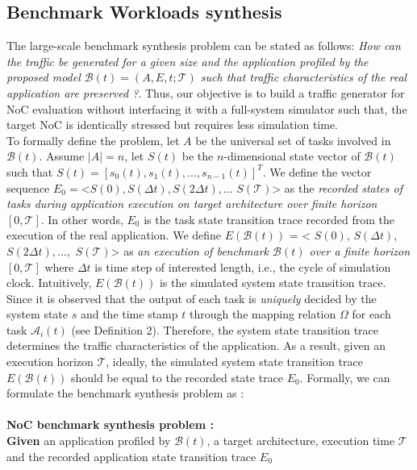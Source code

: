 \subsection{Benchmark Workloads synthesis}
The large-scale benchmark synthesis problem can be stated as follows: \textit{How can the traffic be generated for a given size and the application profiled by the proposed model $\mathcal B(t)=(A,E,t;\mathcal T)$ such that traffic characteristics of the real application are preserved ?}. Thus, our objective is to build a traffic generator for NoC evaluation without interfacing it with a full-system simulator such that, the target NoC is identically stressed but requires less simulation time. \\
\indent To formally define the problem, let $A$ be the universal set of tasks involved in $\mathcal B(t)$. Assume $|A|=n$, let $S(t)$ be the $n$-dimensional state vector of $\mathcal B(t)$ such that $S(t)=[s_0(t),s_1(t),\dots,s_{n-1}(t)]^{T}$. We define the vector sequence $E_0=$<$S(0),S(\Delta t),S(2\Delta t),...$ $S(\mathcal T)$> as the \textit{recorded states of tasks during application execution on target architecture over finite horizon $[0,\mathcal T]$}. In other words, $E_{0}$ is the task state transition trace recorded from the execution of the real application. We define $E(\mathcal B(t))$ = < $S(0)$, $S(\Delta t)$, $S(2\Delta t)$$,...,$ $S(\mathcal T)$> as \textit{an execution of benchmark $\mathcal B(t)$ over a finite horizon $[0,\mathcal T]$} where $\Delta t$ is time step of interested length, i.e., the cycle of simulation clock. Intuitively, $E(\mathcal B(t))$ is the simulated system state transition trace. Since it is observed that the output of each task is \textit{uniquely} decided by the system state $s$ and the time stamp $t$ through the mapping relation $\Omega$ for each task $\mathcal A_{i}(t)$ (see Definition 2). Therefore, the system state transition trace determines the traffic characteristics of the application. As a result, given an execution horizon $\mathcal T$, ideally, the simulated system state transition trace  $E(\mathcal B(t)) $ should be equal to the recorded state trace $E_0$. Formally, we can formulate the benchmark synthesis problem  as :\\\\
\noindent\textbf{NoC benchmark synthesis problem :} \\
\textbf{Given} an application profiled by $\mathcal B(t)$, a target architecture, execution time $\mathcal T$ and the recorded application state transition trace $E_{0}$ \\
$$
